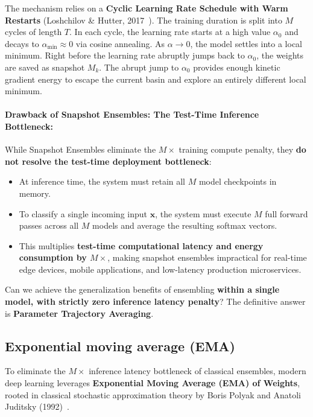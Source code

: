 The mechanism relies on a \textbf{Cyclic Learning Rate Schedule with Warm Restarts} (Loshchilov \& Hutter, 2017~\cite{loshchilov2017sgdr}). The training duration is split into $M$ cycles of length $T$. In each cycle, the learning rate starts at a high value $\alpha_0$ and decays to $\alpha_{\min} \approx 0$ via cosine annealing. As $\alpha \to 0$, the model settles into a local minimum. Right before the learning rate abruptly jumps back to $\alpha_0$, the weights are saved as snapshot $M_k$. The abrupt jump to $\alpha_0$ provides enough kinetic gradient energy to escape the current basin and explore an entirely different local minimum.

\paragraph{Drawback of Snapshot Ensembles: The Test-Time Inference Bottleneck:}
While Snapshot Ensembles eliminate the $M\times$ training compute penalty, they \textbf{do not resolve the test-time deployment bottleneck}:
\begin{itemize}[noitemsep,topsep=2pt,parsep=0pt,partopsep=0pt]
  \item At inference time, the system must retain all $M$ model checkpoints in memory.
  \item To classify a single incoming input $\mathbf{x}$, the system must execute $M$ full forward passes across all $M$ models and average the resulting softmax vectors.
  \item This multiplies \textbf{test-time computational latency and energy consumption by $M\times$}, making snapshot ensembles impractical for real-time edge devices, mobile applications, and low-latency production microservices.
\end{itemize}
Can we achieve the generalization benefits of ensembling \textbf{within a single model, with strictly zero inference latency penalty}? The definitive answer is \textbf{Parameter Trajectory Averaging}.

\subsection{Exponential moving average (EMA)}
\label{sec:polyak_ema}

To eliminate the $M\times$ inference latency bottleneck of classical ensembles, modern deep learning leverages \textbf{Exponential Moving Average (EMA) of Weights}, rooted in classical stochastic approximation theory by Boris Polyak and Anatoli Juditsky (1992)~\cite{polyak1992acceleration}.

